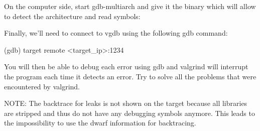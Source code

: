 On the computer side, start gdb-multiarch and give it the 
binary which will allow to detect the architecture and read symbols:

Finally, we'll need to connect to vgdb using the following gdb command:
\begin{bashinput}
(gdb) target remote <target_ip>:1234
\end{bashinput}

You will then be able to debug each error using gdb and valgrind will interrupt
the program each time it detects an error. Try to solve all the problems that
were encountered by valgrind.

NOTE: The backtrace for leaks is not shown on the target because all libraries
are stripped and thus do not have any debugging symbols anymore. This leads to
the impossibility to use the dwarf information for backtracing.
